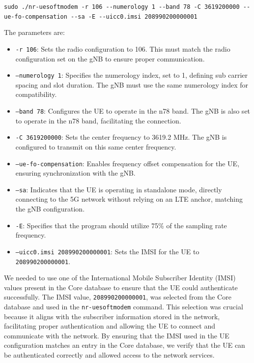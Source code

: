 \lstinline[columns=flexible,breaklines=true]{sudo ./nr-uesoftmodem -r 106 --numerology 1 --band 78 -C 3619200000 --ue-fo-compensation --sa -E --uicc0.imsi 208990200000001}


The parameters are:

\begin{itemize}
    \item \texttt{-r 106}: Sets the radio configuration to 106.
    This must match the radio configuration set on the gNB to ensure proper communication.
    \item \texttt{--numerology 1}: Specifies the numerology index, set to 1, defining sub carrier spacing and slot duration.
    The gNB must use the same numerology index for compatibility.
    \item \texttt{--band 78}: Configures the UE to operate in the n78 band.
    The gNB is also set to operate in the n78 band, facilitating the connection.
    \item \texttt{-C 3619200000}: Sets the center frequency to 3619.2 MHz. The gNB is configured to transmit on this same center frequency.
    \item \texttt{--ue-fo-compensation}: Enables frequency offset compensation for the UE, ensuring synchronization with the gNB.
    \item \texttt{--sa}: Indicates that the UE is operating in standalone mode, directly connecting to the 5G network without relying on an LTE anchor, matching the gNB configuration.
    \item \texttt{-E}: Specifies that the program should utilize 75\% of the sampling rate frequency.
    \item \texttt{--uicc0.imsi 208990200000001}: Sets the IMSI for the UE to \texttt{208990200000001}.
\end{itemize}

We needed to use one of the International Mobile Subscriber Identity (IMSI) values present in the Core database to ensure that the UE could authenticate successfully.
The IMSI value, \texttt{208990200000001}, was selected from the Core database and used in the \texttt{nr-uesoftmodem} command.
This selection was crucial because it aligns with the subscriber information stored in the network, facilitating proper authentication and allowing the UE to connect and communicate with the network.
By ensuring that the IMSI used in the UE configuration matches an entry in the Core database, we verify that the UE can be authenticated correctly and allowed access to the network services.

